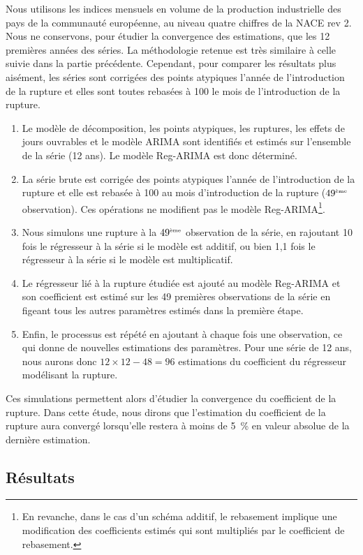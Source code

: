 \documentclass[12pt, a4paper, french]{article}
\begin{document}
Nous utilisons les indices mensuels en volume de la production industrielle des pays de la communauté européenne, au niveau quatre chiffres de la NACE rev 2. Nous ne conservons, pour étudier la convergence des estimations, que les 12 premières années des séries.
La méthodologie retenue est très similaire à celle suivie dans la partie précédente. Cependant, pour comparer les résultats plus aisément, les séries sont corrigées des points atypiques l'année de l'introduction de la rupture et elles sont toutes rebasées à 100 le mois de l'introduction de la rupture.
\begin{enumerate}
	\item Le modèle de décomposition, les points atypiques, les ruptures, les effets de jours ouvrables et le modèle ARIMA sont identifiés et estimés sur l'ensemble de la série (12 ans). Le modèle Reg-ARIMA est donc déterminé.
	\item La série brute est corrigée des points atypiques l'année de l'introduction de la rupture et elle est rebasée à 100 au mois d'introduction de la rupture ($49^{\mbox{\tiny ème}}$ observation). Ces opérations ne modifient pas le modèle Reg-ARIMA\footnote{En revanche, dans le cas d'un schéma additif, le rebasement implique une modification des coefficients estimés qui sont multipliés par le coefficient de rebasement.}.
	\item Nous simulons une rupture à la $49^{\mbox{\tiny ème}}$ observation de la série, en rajoutant 10 fois le régresseur à la série si le modèle est additif, ou bien 1,1 fois le régresseur à la série si le modèle est multiplicatif.
	\item Le régresseur lié à la rupture étudiée est ajouté au modèle Reg-ARIMA et son coefficient est estimé sur les 49 premières observations de la série en figeant tous les autres paramètres estimés dans la première étape.
	\item Enfin, le processus est répété en ajoutant à chaque fois une observation, ce qui donne de nouvelles estimations des paramètres. Pour une série de 12 ans, nous aurons donc $12\times12 - 48 = 96$ estimations du coefficient du régresseur modélisant la rupture.
\end{enumerate}
Ces simulations permettent alors d'étudier la convergence du coefficient de la rupture. Dans cette étude, nous dirons que l'estimation du coefficient de la rupture aura convergé lorsqu'elle restera à moins de 5~\% en valeur absolue de la dernière estimation.

\subsection{Résultats}
\end{document}
